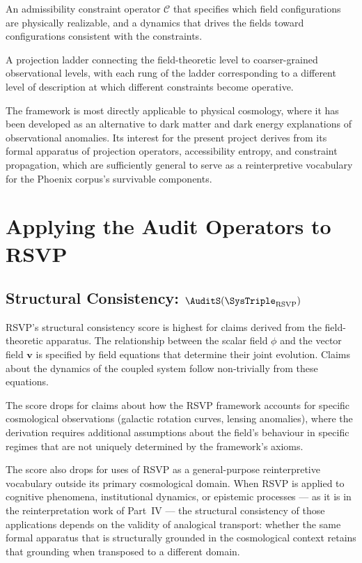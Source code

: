 An admissibility constraint operator $\mathcal{C}$
that specifies which field configurations are physically
realizable, and a dynamics that drives the fields
toward configurations consistent with the constraints.

A projection ladder connecting the field-theoretic
level to coarser-grained observational levels, with
each rung of the ladder corresponding to a different
level of description at which different constraints
become operative.

The framework is most directly applicable to physical
cosmology, where it has been developed as an alternative
to dark matter and dark energy explanations of
observational anomalies. Its interest for the present
project derives from its formal apparatus of projection
operators, accessibility entropy, and constraint
propagation, which are sufficiently general to serve
as a reinterpretive vocabulary for the Phoenix corpus's
survivable components.

\section{Applying the Audit Operators to RSVP}
\label{sec:rsvp-operators}

\subsection{Structural Consistency: \texorpdfstring{$\AuditS(\SysTriple_{\mathrm{RSVP}})$}{S(Theta\_RSVP)}}

RSVP's structural consistency score is highest for
claims derived from the field-theoretic apparatus.
The relationship between the scalar field $\phi$
and the vector field $\mathbf{v}$ is specified by
field equations that determine their joint evolution.
Claims about the dynamics of the coupled system
follow non-trivially from these equations.

The score drops for claims about how the RSVP framework
accounts for specific cosmological observations (galactic
rotation curves, lensing anomalies), where the derivation
requires additional assumptions about the field's
behaviour in specific regimes that are not uniquely
determined by the framework's axioms.

The score also drops for uses of RSVP as a general-purpose
reinterpretive vocabulary outside its primary cosmological
domain. When RSVP is applied to cognitive phenomena,
institutional dynamics, or epistemic processes --- as
it is in the reinterpretation work of Part~IV --- the
structural consistency of those applications depends
on the validity of analogical transport: whether the
same formal apparatus that is structurally grounded
in the cosmological context retains that grounding
when transposed to a different domain.

